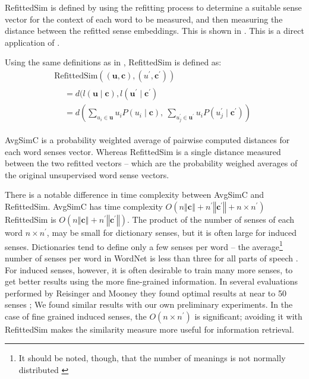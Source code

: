 \documentclass{sig-alternate}
\renewcommand{\c}{\mathbf{c}}
\renewcommand{\u}{\mathbf{u}}
\begin{document}
RefittedSim is defined by using the refitting process to determine a suitable sense vector for the context of each word to be measured, and then measuring the distance between the refitted sense embeddings. This is shown in .
This is a direct application of  . 

Using the same definitions as in , RefittedSim is defined as:
\begin{multline} \label{eq:refittedsim}
\mathrm{RefittedSim}((\u,\c),(u^{\prime},\c^{\prime}))\\
\begin{aligned}
&= d(l(\u \mid \c), l(\u^\prime \mid \c^\prime)\\
&= d\left(
\sum_{u_{i}\in\u}u_{i}P(u_{i}\mid\c),\:
\sum_{u_{j}^{\prime}\in\u^{\prime}}u_{i}P(u_{j}^{\prime}\mid\c^{\prime})\right)
\end{aligned}
\end{multline}

AvgSimC is a probability weighted average of pairwise computed distances for each word senses vector.
Whereas RefittedSim is a single distance measured between the two refitted vectors -- which are the probability weighed averages of the original unsupervised word sense vectors.


There is a notable difference in time complexity between AvgSimC and RefittedSim.
AvgSimC has time complexity $O(n\left\Vert \c\right\Vert +n^{\prime}\left\Vert \c^{\prime}\right\Vert +n\times n^{\prime})$
RefittedSim is $O(n\left\Vert \c\right\Vert +n^{\prime}\left\Vert \c^{\prime}\right\Vert)$.
The product of the number of senses of each word $n \times n^\prime$, may be small for dictionary senses, but it is often large for induced senses. Dictionaries tend to define only a few senses per word -- the average\footnote{It should be noted, though, that the number of meanings is not normally distributed \parencite{zipf1945meaning}} number of senses per word in WordNet is less than three for all parts of speech \parencite{miller1995wordnet}. For induced senses, however, it is often desirable to train many more senses, to get better results using the more fine-grained information. In several evaluations performed by Reisinger and Mooney they found optimal results at near to 50 senses \parencite{Reisinger2010}; We found similar results with our own preliminary experiments. In the case of fine grained induced senses, the $O(n \times n^\prime)$ is significant; avoiding it with RefittedSim makes the similarity measure more useful for information retrieval.
\end{document}
